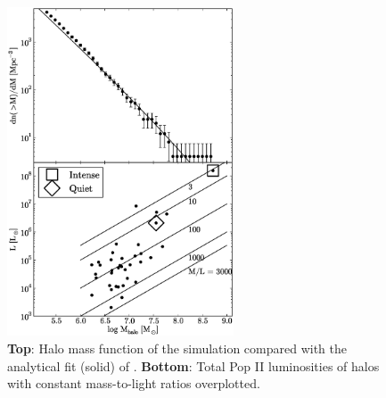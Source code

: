 \documentclass[12pt]{article}
\begin{document}

\clearpage
\begin{figure}
\includegraphics[width=0.6\textwidth]{Lstar.eps}
\caption{\label{fig:massfn} \textbf{Top}: Halo mass function of the
  simulation compared with the analytical fit (solid) of
  \cite{Warren06}.  \textbf{Bottom}: Total Pop II luminosities of
  halos with constant mass-to-light ratios overplotted.}
\end{figure}
\end{document}
